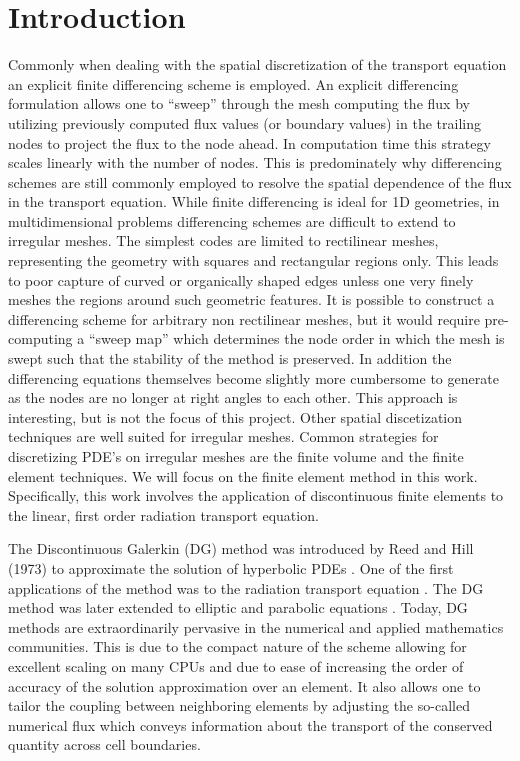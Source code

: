 \section{Introduction}

Commonly when dealing with the spatial discretization of the transport equation
an explicit finite differencing scheme is employed. An explicit differencing
formulation allows one to ``sweep'' through the mesh computing the flux by utilizing
previously computed flux values (or boundary values) in the trailing nodes to
project the flux to the node ahead.  In computation time this strategy scales
linearly with the number of nodes. This is predominately why differencing
schemes are still commonly employed to resolve the spatial dependence of the
flux in the transport equation. While finite differencing is ideal for 1D
geometries, in multidimensional problems differencing schemes are difficult to
extend to irregular meshes. The simplest codes are limited to rectilinear
meshes, representing the geometry with squares and rectangular regions only.
This leads to poor capture of curved or organically shaped edges unless one
very finely meshes the regions around such geometric features. It is possible
to construct a differencing scheme for arbitrary non rectilinear meshes, but it
would require pre-computing a “sweep map” which determines the node order in
which the mesh is swept such that the stability of the method is preserved. In
addition the differencing equations themselves become slightly more cumbersome
to generate as the nodes are no longer at right angles to each other. This
approach is interesting, but is not the focus of this project.  Other spatial
discetization techniques are well suited for irregular meshes. Common
strategies for discretizing PDE’s on irregular meshes are the finite volume and
the finite element techniques. We will focus on the finite element method in
this work. Specifically, this work involves the application of discontinuous
finite elements to the linear, first order radiation transport equation.

The Discontinuous Galerkin (DG) method was introduced by Reed and Hill (1973)
to approximate the solution of hyperbolic PDEs \cite{lesaint}. One of the first applications of the
method was to the radiation transport equation \cite{reed}. The
DG method was later extended to elliptic and parabolic equations \cite{riviere}.  Today,
DG methods are extraordinarily pervasive in the numerical and applied mathematics
communities.  This is due to the compact nature of the scheme allowing for excellent
scaling on many CPUs and due to ease of increasing the order of accuracy of the
solution approximation over an element.  It also allows one to tailor the coupling between
neighboring elements by adjusting the so-called numerical flux which conveys information
about the transport of the conserved quantity across cell boundaries.

